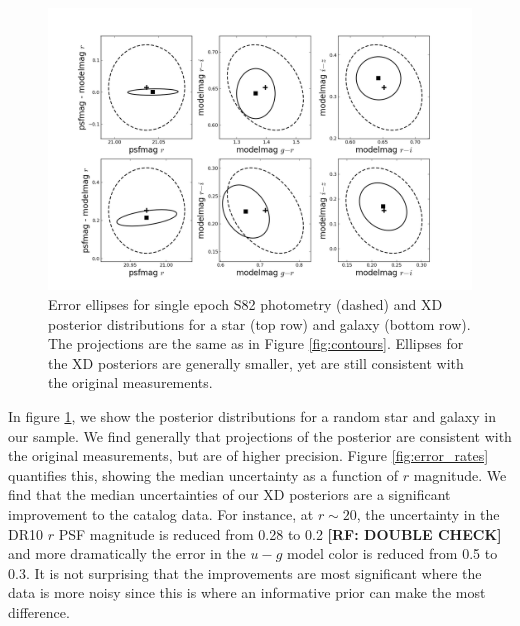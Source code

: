 \documentclass[12pt,preprint]{aastex}
\newcommand\rf[1]{{\bf [RF: #1]}}
\begin{document}
\begin{figure}
\centering
\includegraphics[clip=true, trim=1.5cm 0.5cm 1.5cm 0.5cm,
  width=16cm]{fig2.png}
\caption{Error ellipses for single epoch S82 photometry (dashed) and XD
posterior distributions for a star (top row) and galaxy (bottom row).  The 
projections are the same as in Figure \ref{fig:contours}.  Ellipses for the XD
posteriors are generally smaller, yet are still consistent with the original 
measurements.
}
\label{fig:posteriors}
\end{figure}

In figure \ref{fig:posteriors}, we show the posterior distributions for a
random star and galaxy in our sample.  We find generally that projections of 
the posterior are consistent with the original measurements, but are of higher 
precision.  Figure \ref{fig:error_rates} quantifies this, showing the median 
uncertainty as a function of $r$ magnitude.  We find that the median
uncertainties of our XD posteriors are a significant improvement to the
catalog data.  For instance, at $r\sim20$, the uncertainty in the DR10 $r$ PSF 
magnitude is reduced from 0.28 to 0.2 \rf{DOUBLE CHECK} and more dramatically
the error in the $u-g$ model color is reduced from 0.5 to 0.3.  It is not
surprising that the improvements are most significant where the data is more 
noisy since this is where an informative prior can make the most difference.
\end{document}
